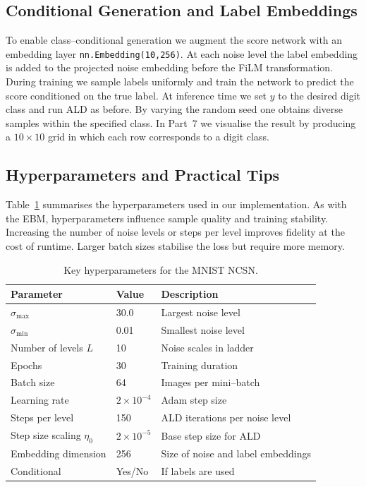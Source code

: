\subsection{Conditional Generation and Label Embeddings}

To enable class–conditional generation we augment the score network with
an embedding layer \texttt{nn.Embedding(10,256)}.  At each noise level
the label embedding is added to the projected noise embedding before the
FiLM transformation.  During training we sample labels uniformly and
train the network to predict the score conditioned on the true label.  At
inference time we set $y$ to the desired digit class and run ALD as
before.  By varying the random seed one obtains diverse samples within
the specified class.  In Part~7 we visualise the result by producing a
$10\times10$ grid in which each row corresponds to a digit class.

\subsection{Hyperparameters and Practical Tips}

Table~\ref{tab:hyperparams-ncsn} summarises the hyperparameters used in
our implementation.  As with the EBM, hyperparameters influence sample
quality and training stability.  Increasing the number of noise levels or
steps per level improves fidelity at the cost of runtime.  Larger batch
sizes stabilise the loss but require more memory.

\begin{table}[H]
    \centering
    \caption{Key hyperparameters for the MNIST NCSN.}
    \label{tab:hyperparams-ncsn}
    \begin{tabular}{lll}
        \toprule
        Parameter & Value & Description \\
        \midrule
        $\sigma_{\max}$ & 30.0 & Largest noise level \\
        $\sigma_{\min}$ & 0.01 & Smallest noise level \\
        Number of levels $L$ & 10 & Noise scales in ladder \\
        Epochs & 30 & Training duration \\
        Batch size & 64 & Images per mini–batch \\
        Learning rate & $2\times 10^{-4}$ & Adam step size \\
        Steps per level & 150 & ALD iterations per noise level \\
        Step size scaling $\eta_0$ & $2\times 10^{-5}$ & Base step size for ALD \\
        Embedding dimension & 256 & Size of noise and label embeddings \\
        Conditional & Yes/No & If labels are used \\
        \bottomrule
    \end{tabular}
\end{table}

